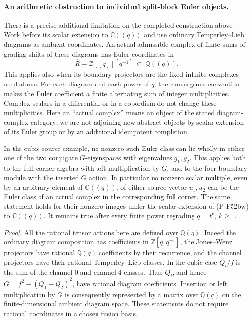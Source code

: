 \paragraph{An arithmetic obstruction to individual split-block Euler objects.}
There is a precise additional limitation on the completed construction
above.  Work before its scalar extension to $\mathbb C((q))$ and use
ordinary Temperley--Lieb diagrams as ambient coordinates.  An actual
admissible complex of finite sums of grading shifts of these diagrams
has Euler coordinates in
\[
             \widehat R=\mathbb Z[[q]][q^{-1}]
                          \ \subset\ \mathbb Q((q)).
                                                               \tag{P-F52cf}
\]
This applies also when its boundary projectors are the fixed infinite
complexes used above.  For each diagram and each power of $q$, the
convergence convention makes the Euler coefficient a finite alternating
sum of integer multiplicities.  Complex scalars in a differential or
in a cobordism do not change these multiplicities.  Here an ``actual
complex'' means an object of the stated diagram-complex category; we
are not adjoining new abstract objects by scalar extension of its
Euler group or by an additional idempotent completion.

In the cubic source example, no nonzero such Euler class can lie
wholly in either one of the two conjugate $G$-eigenspaces with
eigenvalues $g_1,g_2$.  This applies both to the full corner algebra
with left multiplication by $G$, and to the four-boundary module
with the inserted $G$ action.  In particular no nonzero scalar
multiple, even by an arbitrary element of $\mathbb C((q))$, of
either source vector $u_1,u_2$ can be the Euler class of an actual
complex in the corresponding full corner.  The same statement
holds for their nonzero images under the scalar extension of
(P-F52bw) to $\mathbb C((q))$.  It remains true
after every finite power regrading $q=t^k$, $k\ge1$.

\emph{Proof.}
All the rational tensor actions here are defined over $\mathbb Q(q)$.
Indeed the ordinary diagram composition has coefficients in
$\mathbb Z[q,q^{-1}]$, the Jones--Wenzl projectors have rational
$\mathbb Q(q)$ coefficients by their recurrence, and the channel
projectors have their rational Temperley--Lieb classes.  In the
cubic case $Q_i/f$ is the sum of the channel-$0$ and channel-$4$
classes.  Thus $Q_i$, and hence
$G=f^2-(Q_1-Q_2)^2$, have rational diagram coefficients.
Insertion or left multiplication by $G$ is consequently represented
by a matrix over $\mathbb Q(q)$ on the finite-dimensional ambient
diagram space.  These statements do not require rational
coordinates in a chosen fusion basis.

